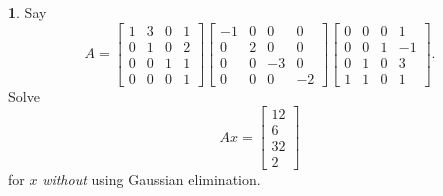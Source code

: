 \documentclass{article}
\theoremstyle{definition}
\newtheorem{prob}{}
\begin{document}
\begin{prob}
	Say 
	\[A=\begin{bmatrix}
		1& 3& 0& 1\\
		0&1&0&2\\
		0&0&1&1\\
		0&0&0&1
	\end{bmatrix}
\begin{bmatrix}
	-1& 0& 0& 0\\
	0&2&0&0\\
	0&0&-3&0\\
	0&0&0&-2
\end{bmatrix}
\begin{bmatrix}
	0& 0& 0& 1\\
	0&0&1&-1\\
	0&1&0&3\\
	1&1&0&1
\end{bmatrix}.\]
Solve 
\[Ax=\begin{bmatrix}
	12\\6\\32\\2
\end{bmatrix}\]
for $x$ \emph{without} using Gaussian elimination.
\end{prob}
\end{document}
